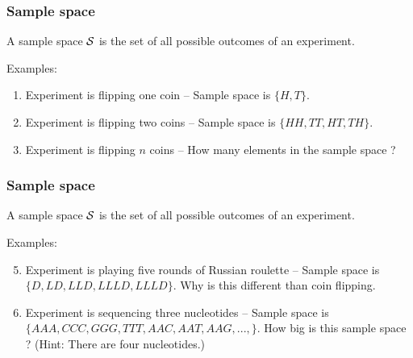 \begin{frame}[fragile]\frametitle{Sample space}

\begin{defn}
A sample space $\cal S$ is the set of all possible outcomes
of an experiment.  \\
\end{defn}

\vspace{.1in}

Examples:

\begin{enumerate}

\item Experiment is flipping one coin -- Sample space is $\{H,T\}$. 

\item Experiment is flipping two coins -- Sample space is
  $\{HH,TT,HT,TH\}$. 

\item Experiment is flipping $n$ coins -- How many elements in the
  sample space ? 

\end{enumerate}
\end{frame}

\begin{frame}[fragile]\frametitle{Sample space}

\begin{defn}
A sample space $\cal S$ is the set of all possible outcomes
of an experiment.  
\end{defn}

\vspace{.1in}

Examples:

\begin{enumerate}
\setcounter{enumi}{4}
\item Experiment is playing five rounds of Russian roulette  -- Sample
  space is $\{D,LD,LLD,LLLD,LLLD\}$. Why is this different than coin 
flipping. 

\item Experiment is sequencing three nucleotides -- Sample space is 
$\{AAA,CCC,GGG,TTT,AAC,AAT,AAG,...,\}$. How big is this sample space ?
(Hint: There are four nucleotides.)


\end{enumerate}

\end{frame}


